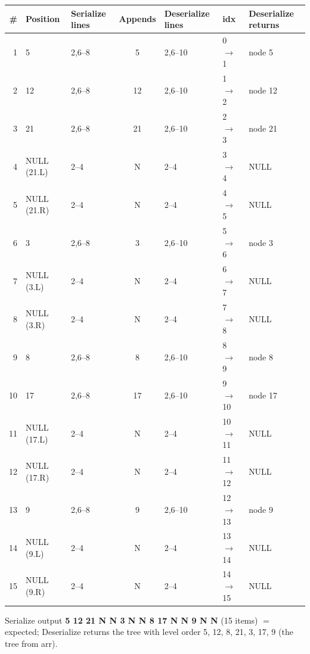 \documentclass[10pt]{article}
\newcommand{\nul}[1]{NULL\,{\tiny(#1)}}
\begin{document}
{\scriptsize
\begin{tabularx}{\linewidth}{@{}r l l c l l Y@{}}
\toprule
\# & Position & Serialize lines & Appends & Deserialize lines & idx & Deserialize returns \\
 & 5 & 2,6--8 & 5 & 2,6--10 & 0 $\to$ 1 & node 5 \\
2 & 12 & 2,6--8 & 12 & 2,6--10 & 1 $\to$ 2 & node 12 \\
3 & 21 & 2,6--8 & 21 & 2,6--10 & 2 $\to$ 3 & node 21 \\
4 & \nul{21.L} & 2--4 & N & 2--4 & 3 $\to$ 4 & NULL \\
5 & \nul{21.R} & 2--4 & N & 2--4 & 4 $\to$ 5 & NULL \\
6 & 3 & 2,6--8 & 3 & 2,6--10 & 5 $\to$ 6 & node 3 \\
7 & \nul{3.L} & 2--4 & N & 2--4 & 6 $\to$ 7 & NULL \\
8 & \nul{3.R} & 2--4 & N & 2--4 & 7 $\to$ 8 & NULL \\
9 & 8 & 2,6--8 & 8 & 2,6--10 & 8 $\to$ 9 & node 8 \\
10 & 17 & 2,6--8 & 17 & 2,6--10 & 9 $\to$ 10 & node 17 \\
11 & \nul{17.L} & 2--4 & N & 2--4 & 10 $\to$ 11 & NULL \\
12 & \nul{17.R} & 2--4 & N & 2--4 & 11 $\to$ 12 & NULL \\
13 & 9 & 2,6--8 & 9 & 2,6--10 & 12 $\to$ 13 & node 9 \\
14 & \nul{9.L} & 2--4 & N & 2--4 & 13 $\to$ 14 & NULL \\
15 & \nul{9.R} & 2--4 & N & 2--4 & 14 $\to$ 15 & NULL \\
\bottomrule
\end{tabularx}}
{\footnotesize Serialize output \textbf{5 12 21 N N 3 N N 8 17 N N 9 N N} (15 items) $=$ expected; Deserialize returns the tree with level order 5, 12, 8, 21, 3, 17, 9 (the tree from arr).}
\end{document}
